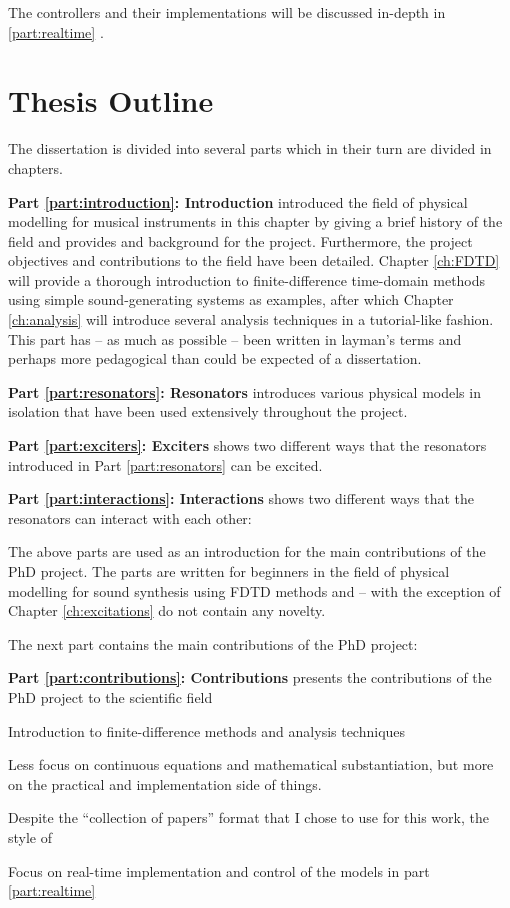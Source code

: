 The controllers and their implementations will be discussed in-depth in \ref{part:realtime} .

\section{Thesis Outline}
The dissertation is divided into several parts which in their turn are divided in chapters. 

\textbf{Part \ref{part:introduction}: Introduction} introduced the field of physical modelling for musical instruments in this chapter by giving a brief history of the field and provides and background for the project. Furthermore, the project objectives and contributions to the field have been detailed. Chapter \ref{ch:FDTD} will provide a thorough introduction to finite-difference time-domain methods using simple sound-generating systems as examples, after which Chapter \ref{ch:analysis} will introduce several analysis techniques in a tutorial-like fashion. This part has -- as much as possible -- been written in layman's terms and perhaps more pedagogical than could be expected of a dissertation. 

\textbf{Part \ref{part:resonators}: Resonators} introduces various physical models in isolation that have been used extensively throughout the project. 

\textbf{Part \ref{part:exciters}: Exciters} shows two different ways that the resonators introduced in Part \ref{part:resonators} can be excited. 

\textbf{Part \ref{part:interactions}: Interactions} shows two different ways that the resonators can interact with each other: 

The above parts are used as an introduction for the main contributions of the PhD project. The parts are written for beginners in the field of physical modelling for sound synthesis using FDTD methods and -- with the exception of Chapter \ref{ch:excitations} do not contain any novelty. 

The next part contains the main contributions of the PhD project:

\textbf{Part \ref{part:contributions}: Contributions} presents the contributions of the PhD project to the scientific field 

Introduction to finite-difference methods and analysis techniques

Less focus on continuous equations and mathematical substantiation, but more on the practical and implementation side of things.

Despite the ``collection of papers'' format that I chose to use for this work, the style of  


Focus on real-time implementation and control of the models in part \ref{part:realtime}